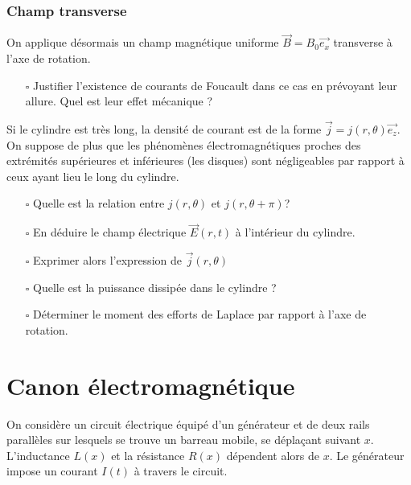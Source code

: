 \documentclass{report}
\begin{document}
	
\subsubsection*{Champ transverse}	
	
	On applique désormais un champ magnétique uniforme $\vec{B}=B_{0}\vec{e_{x}}$ transverse à l'axe de rotation.
	
\begin{itemize}
	
		\item[$\square$] Justifier l'existence de courants de Foucault dans ce cas en prévoyant leur allure. Quel est leur effet mécanique ?

\end{itemize}
		
Si le cylindre est très long, la densité de courant est de la forme $\vec{j}=j(r,\theta)\vec{e_{z}}$. On suppose de plus que les phénomènes électromagnétiques proches des extrémités supérieures et inférieures (les disques) sont négligeables par rapport à ceux ayant lieu le long du cylindre.

\begin{itemize}

		\item[$\square$] Quelle est la relation entre $j(r,\theta)$ et $j(r,\theta+\pi)$?
		
		\item[$\square$] En déduire le champ électrique $\vec{E}(r,t)$ à l'intérieur du cylindre.
		
		\item[$\square$] Exprimer alors l'expression de $\vec{j}(r,\theta)$ 
		
		\item[$\square$] Quelle est la puissance dissipée dans le cylindre ?
		
		\item[$\square$] Déterminer le moment des efforts de Laplace par rapport à l'axe de rotation.
		
\end{itemize}

\newpage

\section*{Canon électromagnétique}

On considère un circuit électrique équipé d'un générateur et de deux rails parallèles sur lesquels se trouve un barreau mobile, se déplaçant suivant $x$. L'inductance $L(x)$ et la résistance $R(x)$ dépendent alors de $x$. Le générateur impose un courant $I(t)$ à travers le circuit. 
\end{document}
